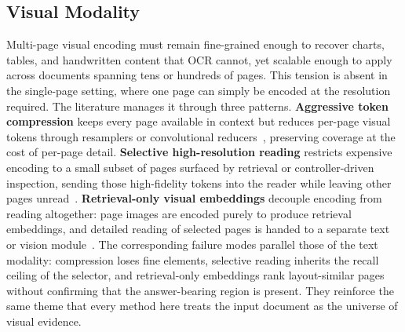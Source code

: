 \documentclass[11pt]{article}
\begin{document}
\subsection{Visual Modality}
Multi-page visual encoding must remain fine-grained enough to recover charts, tables, and handwritten content that OCR cannot, yet scalable enough to apply across documents spanning tens or hundreds of pages. This tension is absent in the single-page setting, where one page can simply be encoded at the resolution required. The literature manages it through three patterns. \textbf{Aggressive token compression} keeps every page available in context but reduces per-page visual tokens through resamplers or convolutional reducers~\cite{hu2025mplug2,yu2024texthawk2}, preserving coverage at the cost of per-page detail. \textbf{Selective high-resolution reading} restricts expensive encoding to a small subset of pages surfaced by retrieval or controller-driven inspection, sending those high-fidelity tokens into the reader while leaving other pages unread~\cite{zheng2026docvstar,jain2025simpledoc}. \textbf{Retrieval-only visual embeddings} decouple encoding from reading altogether: page images are encoded purely to produce retrieval embeddings, and detailed reading of selected pages is handed to a separate text or vision module~\cite{cho2024m3docrag,tanaka2025vdocrag}. The corresponding failure modes parallel those of the text modality: compression loses fine elements, selective reading inherits the recall ceiling of the selector, and retrieval-only embeddings rank layout-similar pages without confirming that the answer-bearing region is present. They reinforce the same theme that every method here treats the input document as the universe of visual evidence.
\end{document}
